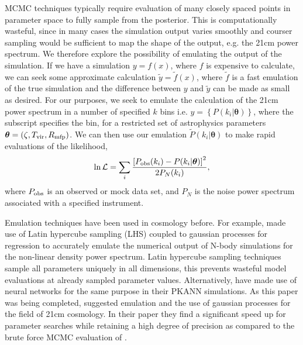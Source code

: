 \documentclass[useAMS,usenatbib]{mnras}
\begin{document}
MCMC techniques typically require evaluation of many closely spaced points in parameter space to fully sample from the posterior. 
This is computationally wasteful, since in many cases the simulation output varies smoothly and courser sampling would be sufficient to map the shape of the output, e.g. the 21cm power spectrum.
We therefore explore the possibility of emulating the output of the simulation. 
If we have a simulation $y = f(x)$, where $f$ is expensive to calculate, we can seek some approximate calculation $\tilde{y} = \tilde{f}(x)$, where $\tilde{f}$ is a fast emulation of the true simulation and the difference between $y$ and $\tilde{y}$ can be made as small as desired.
For our purposes, we seek to emulate the calculation of the 21cm power spectrum in a number of specified $k$ bins i.e. $y = \left\lbrace P(k_i|\boldsymbol{\theta})\right\rbrace$, where the subscript specifies the bin, for a restricted set of astrophysics parameters $\boldsymbol{\theta} = \left(\zeta, T_{\rm vir}, R_{\rm mfp}\right)$.
We can then use our emulation $\tilde{P}(k_i|\boldsymbol{\theta})$ to make rapid evaluations of the likelihood, 
\begin{equation}\label{eq:loglikelihood}
\ln \mathcal{L} = \sum\limits_i\frac{\left[P_{\rm obs}(k_i) - P(k_i|\boldsymbol{\theta})\right]^2}{2P_N(k_i)},
\end{equation}
where $P_{\rm obs}$ is an observed or mock data set, and $P_N$ is the noise power spectrum associated with a specified instrument.

Emulation techniques have been used in cosmology before. 
For example, \citet{heitmann2009, heitmann2014, heitmann2016} made use of Latin hypercube sampling (LHS) coupled to gaussian processes for regression to accurately emulate the numerical output of N-body simulations for the non-linear density power spectrum. 
Latin hypercube sampling techniques sample all parameters uniquely in all dimensions, this prevents wasteful model evaluations at already sampled parameter values. 
Alternatively, \citet{Agarwal2012} have made use of neural networks for the same purpose in their PKANN simulations.
As this paper was being completed, \citet{Kern2017} suggested emulation and the use of gaussian processes for the field of 21cm cosmology. 
In their paper they find a significant speed up for parameter searches while retaining a high degree of precision as compared to the brute force MCMC evaluation of \citet{greig2017}.
\end{document}
